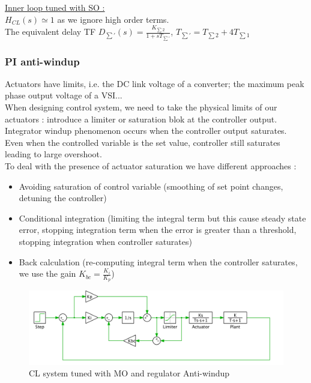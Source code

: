 \documentclass[../main.tex]{subfiles}
\begin{document}
\quad \underline{Inner loop tuned with SO :}\\
$H_{CL}(s) \simeq 1$ as we ignore high order terms.\\
The equivalent delay TF $D_{\sum'}(s) = \frac{K_{\sum 2}}{1+sT_{\sum'}}$, $T_{\sum'} = T_{\sum 2} + 4T_{\sum 1}$\\

\subsubsection{PI anti-windup}
Actuators have limits, i.e. the DC link voltage of a converter; the maximum peak phase output voltage of a VSI...\\
When designing control system, we need to take the physical limits of our actuators : introduce a limiter or saturation blok at the controller output.\\

Integrator windup phenomenon occurs when the controller output saturates. Even when the controlled variable is the set value, controller still saturates leading to large overshoot.\\

To deal with the presence of actuator saturation we have different approaches : \begin{itemize}
    \item Avoiding saturation of control variable (smoothing of set point changes, detuning the controller)
    \item Conditional integration (limiting the integral term but this cause steady state error, stopping integration term when the error is greater than a threshold, stopping integration when controller saturates)
    \item Back calculation (re-computing integral term when the controller saturates, we use the gain $K_{bc} = \frac{K_i}{K_p}$)
\end{itemize}

\begin{figure}[hbt!]
    \centering
    \includegraphics[width=0.7\linewidth]{IMAGES/Indus_el/IMG_0179.jpeg}
    \caption{CL system tuned with MO and regulator Anti-windup}
\end{figure}
\end{document}
